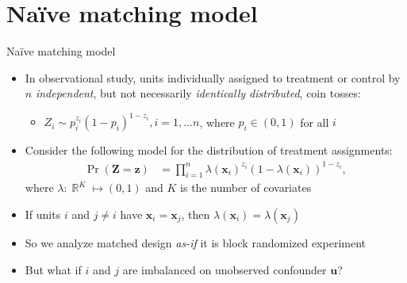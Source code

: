 \documentclass[table, xcolor={dvipsnames}, 9pt]{beamer}
\theoremstyle{newstyle}
\DeclareMathOperator{\R}{\mathbb{R}}
\begin{document}
\section{Na\"{i}ve matching model}
\begin{frame}{Na\"{i}ve matching model}
\vfill
\begin{itemize} \vfill
\item In observational study, units individually assigned to treatment or control by $n$ \textit{independent}, but not necessarily \textit{identically distributed}, coin tosses: \vfill
\begin{itemize} \vfill
\item $Z_i \sim p_i^{z_i} \left(1 - p_i\right)^{1 - z_i}, i = 1, \dots n$, where $p_i \in (0, 1)$ for all $i$ \vfill
\end{itemize} \vfill
\item  Consider the following model for the distribution of treatment assignments:  \vfill
\begin{align*} 
\Pr\left(\mathbf{Z} = \mathbf{z}\right) & = \prod \limits_{i = 1}^n \lambda\left(\mathbf{x}_i\right)^{z_i} \left(1 - \lambda\left(\mathbf{x}_i\right)\right)^{1 - z_i},
\end{align*}
where $\lambda: \R^K \mapsto (0, 1)$ and $K$ is the number of covariates \vfill
\item  If units $i$ and $j \neq i$ have $\bm{x}_i = \bm{x}_j$, then $\lambda\left(\mathbf{x}_i \right) = \lambda\left(\mathbf{x}_j \right)$ \vfill
\item  So we analyze matched design \textit{as-if} it is block randomized experiment \vfill
\item But what if $i$ and $j$ are imbalanced on unobserved confounder $\bm{u}$? \vfill
\end{itemize} \vfill
\end{frame}
\end{document}

